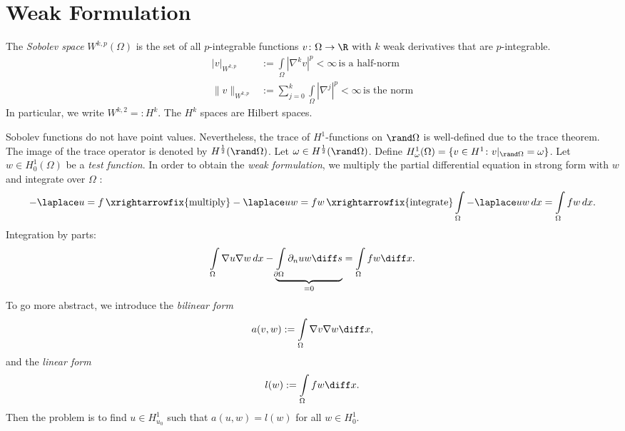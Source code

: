 \section{Weak Formulation}
\begin{definition}
The \textit{Sobolev space} $W^{k,p}(\Omega)$ is the set of all $p$-integrable functions $v\colon\Omega\to\R$ with $k$ weak derivatives that are $p$-integrable.
\begin{align*}
  |v|_{W^{k,p}} &:= \int\limits_\Omega|\nabla^kv|^p<\infty\,\text{is a half-norm} \\
  \|v\|_{W^{k,p}} &:= \sum_{j=0}^k \int\limits_\Omega |\nabla^j|^p < \infty\, \text{is the norm}
\end{align*}
In particular, we write $W^{k,2}=: H^k$. The $H^k$ spaces are Hilbert spaces.
\end{definition}
Sobolev functions do not have point values. Nevertheless, the trace of $H^1$-functions on $\boundary\Omega$ is well-defined due to the trace theorem. The image of the trace operator is denoted by $H^{\frac{1}{2}}(\boundary\Omega)$. Let $\omega\in H^{\frac{1}{2}}(\boundary\Omega)$. Define $H_\omega^1(\Omega)=\{ v\in H^1\colon v|_{\boundary\Omega}=\omega\}$. Let $w\in H_0^1(\Omega)$ be a \textit{test function}. In order to obtain the \textit{weak formulation}, we multiply the partial differential equation in strong form with $w$ and integrate over $\Omega$ :
\begin{equation*}
    -\laplace u=f\, \xrightarrowfix{\text{multiply}}-\laplace uw=fw\,\xrightarrowfix{\text{integrate}}\int\limits_\Omega-\laplace uw\,dx=\int\limits_\Omega fw\,dx.
\end{equation*}
Integration by parts:
\begin{equation*}
    \int\limits_\Omega\nabla u\nabla w\,dx-\underbrace{\int\limits_{\partial\Omega}\partial_{n}uw \diff s}_{=0}=\int\limits_\Omega fw\diff x.
\end{equation*}
To go more abstract, we introduce the \textit{bilinear form}
\begin{equation*}
    a(v,w):=\int\limits_\Omega\nabla v\nabla w\diff x,
\end{equation*}
and the \textit{linear form}
\begin{equation*}
    l(w):=\int\limits_\Omega fw\diff x.
\end{equation*}
Then the problem is to find $u\in H_{u_0}^1$ such that $a(u,w)=l(w)$ for all $w\in H_0^1$.
